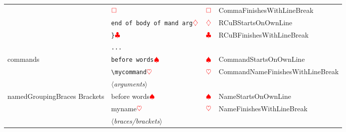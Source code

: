 \begin{longtable}{llll}
		                                                       & $\color{red}\square$                                      & $\color{red}\square$            & CommaFinishesWithLineBreak                                        \\
		                                                       & \verb!end of body of mand arg!$\color{red}\diamondsuit$               & $\color{red}\diamondsuit$                   & RCuBStartsOnOwnLine                                               \\
		                                                       & \verb!}!$\color{red}\clubsuit$                               & $\color{red}\clubsuit$             & RCuBFinishesWithLineBreak                                         \\
		                                                       & \verb!...!                                                        &                                         &                                                                   \\
		\cmidrule{2-4}
		commands                                               & \verb!before words!$\color{red}\spadesuit$                        & $\color{red}\spadesuit$                 & CommandStartsOnOwnLine                                            \\
		                                                       & \verb!\mycommand!$\color{red}\heartsuit$                           & $\color{red}\heartsuit$                  & CommandNameFinishesWithLineBreak                                  \\
		                                                       & $\langle$\itshape{arguments}$\rangle$                             &                                         &                                                                   \\
		\cmidrule{2-4}
		namedGroupingBraces Brackets                           & before words$\color{red}\spadesuit$                               & $\color{red}\spadesuit$                 & NameStartsOnOwnLine                                               \\
		                                                       & myname$\color{red}\heartsuit$                                      & $\color{red}\heartsuit$                  & NameFinishesWithLineBreak                                         \\
		                                                       & $\langle$\itshape{braces/brackets}$\rangle$                       &                                         &                                                                   \\

\end{longtable}
